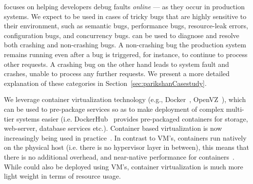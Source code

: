 \parikshan focuses on helping developers debug faults \emph{online} --- as they occur in production systems.
We expect \parikshan to be used in cases of tricky bugs that are highly sensitive to their environment, such as semantic bugs, performance bugs, resource-leak errors, configuration bugs, and concurrency bugs.
\parikshan can be used to diagnose and resolve both crashing and non-crashing bugs. 
A non-crashing bug the production system remains running even after a bug is triggered, for instance, to continue to process other requests.
A crashing bug on the other hand leads to system fault and crashes, unable to process any further requests.
We present a more detailed explanation of these categories in Section~\ref{sec:parikshanCasestudy}. 


We leverage container virtualization technology (e.g., Docker~\cite{docker}, OpenVZ~\cite{openvz}), which can be used to pre-package services so as to make deployment of complex multi-tier systems easier (i.e. DockerHub~\cite{dockerhub,dockerhub_article} provides pre-packaged containers for storage, web-server, database services etc.).
Container based virtualization is now increasingly being used in practice~\cite{containerCloud}.
In contrast to VM's, containers run natively on the physical host (i.e. there is no hypervisor layer in between), this means that there is no additional overhead, and near-native performance for containers~\cite{performanceComparisonlxcVM,performanceEvalContainers}.
While \parikshan could also be deployed using VM's, container virtualization is much more light weight in terms of resource usage.



